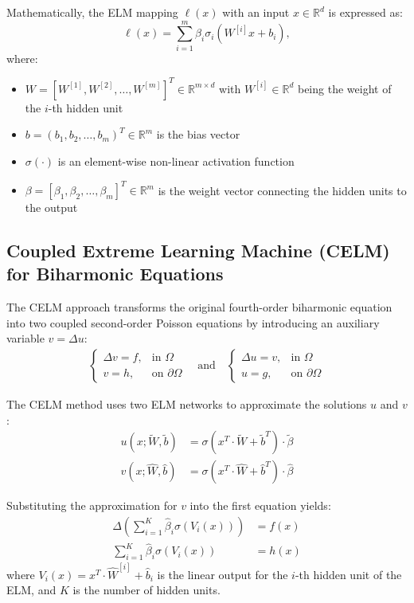 \documentclass[11pt]{article}
\begin{document}
Mathematically, the ELM mapping $\ell(x)$ with an input $x \in \mathbb{R}^d$ is expressed as:
\begin{equation}
\ell(x) = \sum_{i=1}^{m} \beta_i \sigma_i(W^{[i]}x + b_i),
\end{equation}
where:
\begin{itemize}
    \item $W = [W^{[1]}, W^{[2]}, \ldots, W^{[m]}]^T \in \mathbb{R}^{m \times d}$ with $W^{[i]} \in \mathbb{R}^d$ being the weight of the $i$-th hidden unit
    \item $b = (b_1, b_2, \ldots, b_m)^T \in \mathbb{R}^m$ is the bias vector
    \item $\sigma(\cdot)$ is an element-wise non-linear activation function
    \item $\beta = [\beta_1, \beta_2, \ldots, \beta_m]^T \in \mathbb{R}^m$ is the weight vector connecting the hidden units to the output
\end{itemize}

\subsection{Coupled Extreme Learning Machine (CELM) for Biharmonic Equations}

The CELM approach transforms the original fourth-order biharmonic equation into two coupled second-order Poisson equations by introducing an auxiliary variable $v = \Delta u$:
\begin{align}
\begin{cases}
\Delta v = f, & \text{in } \Omega \\
v = h, & \text{on } \partial\Omega
\end{cases}
\quad \text{and} \quad
\begin{cases}
\Delta u = v, & \text{in } \Omega \\
u = g, & \text{on } \partial\Omega
\end{cases}
\end{align}

The CELM method uses two ELM networks to approximate the solutions $u$ and $v$:
\begin{align}
u(x; \tilde{W}, \tilde{b}) &= \sigma(x^T \cdot \tilde{W} + \tilde{b}^T) \cdot \tilde{\beta} \\
v(x; \hat{W}, \hat{b}) &= \sigma(x^T \cdot \hat{W} + \hat{b}^T) \cdot \hat{\beta}
\end{align}

Substituting the approximation for $v$ into the first equation yields:
\begin{align}
\Delta \left( \sum_{i=1}^{K} \hat{\beta}_i \sigma(V_i(x)) \right) &= f(x) \\
\sum_{i=1}^{K} \hat{\beta}_i \sigma(V_i(x)) &= h(x)
\end{align}
where $V_i(x) = x^T \cdot \hat{W}^{[i]} + \hat{b}_i$ is the linear output for the $i$-th hidden unit of the ELM, and $K$ is the number of hidden units.
\end{document}
